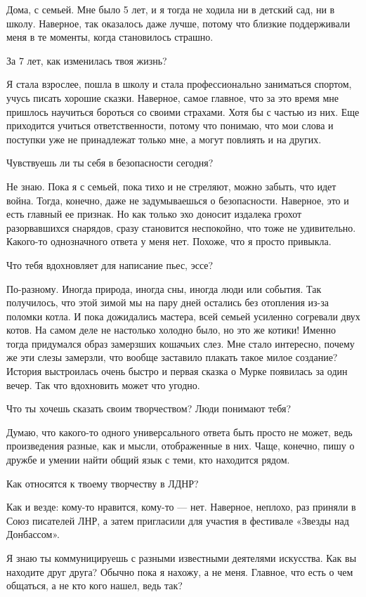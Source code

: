 Дома, с семьей. Мне было 5 лет, и я тогда не ходила ни в детский сад, ни в
школу. Наверное, так оказалось даже лучше, потому что близкие поддерживали меня
в те моменты, когда становилось страшно.

За 7 лет, как изменилась твоя жизнь?

Я стала взрослее, пошла в школу и стала профессионально заниматься спортом,
учусь писать хорошие сказки. Наверное, самое главное, что за это время мне
пришлось научиться бороться со своими страхами. Хотя бы с частью из них. Еще
приходится учиться ответственности, потому что понимаю, что мои слова и
поступки уже не принадлежат только мне, а могут повлиять и на других.

Чувствуешь ли ты себя в безопасности сегодня?

Не знаю. Пока я с семьей, пока тихо и не стреляют, можно забыть, что идет
война. Тогда, конечно, даже не задумываешься о безопасности. Наверное, это и
есть главный ее признак. Но как только эхо доносит издалека грохот
разорвавшихся снарядов, сразу становится неспокойно, что тоже не удивительно.
Какого-то однозначного ответа у меня нет. Похоже, что я просто привыкла.

Что тебя вдохновляет для написание пьес, эссе?

По-разному. Иногда природа, иногда сны, иногда люди или события. Так
получилось, что этой зимой мы на пару дней остались без отопления из-за поломки
котла. И пока дожидались мастера, всей семьей усиленно согревали двух котов. На
самом деле не настолько холодно было, но это же котики! Именно тогда придумался
образ замерзших кошачьих слез. Мне стало интересно, почему же эти слезы
замерзли, что вообще заставило плакать такое милое создание? История
выстроилась очень быстро и первая сказка о Мурке появилась за один вечер. Так
что вдохновить может что угодно.

Что ты хочешь сказать своим творчеством? Люди понимают тебя?

Думаю, что какого-то одного универсального ответа быть просто не может, ведь
произведения разные, как и мысли, отображенные в них. Чаще, конечно, пишу о
дружбе и умении найти общий язык с теми, кто находится рядом.

Как относятся к твоему творчеству в ЛДНР?

Как и везде: кому-то нравится, кому-то --- нет. Наверное, неплохо, раз приняли в
Союз писателей ЛНР, а затем пригласили для участия в фестивале «Звезды над
Донбассом».

Я знаю ты коммуницируешь с разными известными деятелями искусства. Как вы находите друг друга?
Обычно пока я нахожу, а не меня. Главное, что есть о чем общаться, а не кто кого нашел, ведь так?

